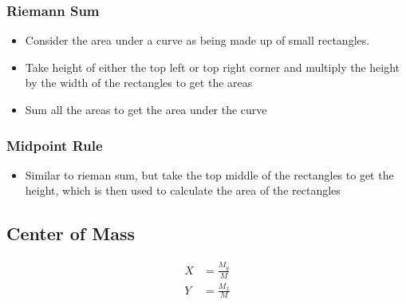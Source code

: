     \subsubsection{Riemann Sum}

      \begin{itemize}
        \item Consider the area under a curve as being made up of small rectangles.
        \item Take height of either the top left or top right corner and
        multiply the height by the width of the rectangles to get the areas
        \item Sum all the areas to get the area under the curve
      \end{itemize}

    \subsubsection{Midpoint Rule}

      \begin{itemize}
        \item Similar to rieman sum, but take the top middle of the rectangles
        to get the height, which is then used to calculate the area of the
        rectangles
      \end{itemize}

  \subsection{Center of Mass}

    \begin{align}
      X &= \frac{M_{y}}{M} \\
      Y &= \frac{M_{x}}{M}
    \end{align}
